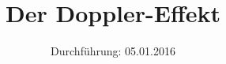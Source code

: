 

\subject{Versuchsprotokoll zum Versuch Nr. 104}
\title{Der Doppler-Effekt}
\date{
  Durchführung: 05.01.2016
}



\maketitle
\newpage






\printbibliography


